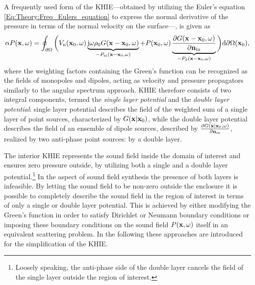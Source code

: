 A frequently used form of the KHIE---obtained by utilizing the Euler's equation \eqref{Eq:Theory:Freq_Eulers_equation} to express the normal derivative of the pressure in terms of the normal velocity on the surface---, is given as	
\begin{equation}
\alpha P(\mathbf{x},\omega) = 
\oint_{\partial \Omega}  \bigg(  
V_{\mathrm{n}}(\mathbf{x}_0,\omega) \underbrace{\mathrm{j} \omega \rho_0 G(\mathbf{x}-\mathbf{x}_0,\omega) }_{-P_{\mathrm{m}}(\mathbf{x}-\mathbf{x}_0,\omega)}
+
P(\mathbf{x}_0,\omega)  \underbrace{\frac{\partial G(\mathbf{x}-\mathbf{x}_0,\omega)}{\partial \mathbf{n}_{\mathrm{in}}}}_{-P_{\mathrm{d}}(\mathbf{x}-\mathbf{x}_0,\omega)}
\bigg)   \mathrm{d} \partial \Omega(\mathbf{x}_0),
\label{Eq:Theory:Kirchhoff}
\end{equation}
where the weighting factors containing the Green's function can be recognized as the fields of monopoles and dipoles, acting as velocity and pressure propagators similarly to the angular spectrum approach.
KHIE therefore consists of two integral components, termed the \emph{single layer potential} and the \emph{double layer potential}: single layer potential describes the field of the weighted sum of a single layer of point sources, characterized by $ G(\mathbf{x}|\mathbf{x}_0) $, while the double layer potential describes the field of an ensemble of dipole sources, described by $\frac{\partial G(\mathbf{x}|\mathbf{x}_0,\omega)}{\partial \mathbf{n}_{\mathrm{in}}}$, realized by two anti-phase point sources: by a double layer.

The interior KHIE represents the sound field inside the domain of interest and ensures zero pressure outside, by utilizing both a single and a double layer potential.\footnote{Loosely speaking, the anti-phase side of the double layer cancels the field of the single layer outside the region of interest.}
In the aspect of sound field synthesis the presence of both layers is infeasible.
By letting the sound field to be non-zero outside the enclosure it is possible to completely describe the sound field in the region of interest in terms of only a single or double layer potential.
This is achieved by either modifying the Green's function in order to satisfy Dirichlet or Neumann boundary conditions or imposing these boundary conditions on the sound field $P(\mathbf{x},\omega)$ itself in an equivalent scattering problem.
In the following these approaches are introduced for the simplification of the KHIE.
%
%

